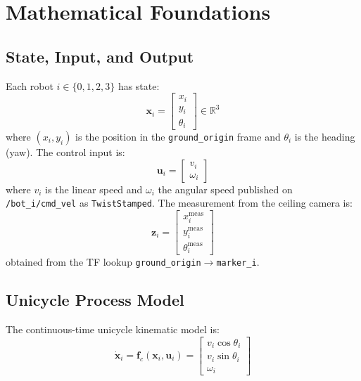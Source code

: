 \documentclass[12pt,a4paper]{article}
\begin{document}
\section{Mathematical Foundations}
\label{sec:math}

\subsection{State, Input, and Output}

Each robot $i \in \{0,1,2,3\}$ has state:
\begin{equation}
  \bm{x}_i = \begin{bmatrix} x_i \\ y_i \\ \theta_i \end{bmatrix} \in \mathbb{R}^3
\end{equation}
where $(x_i, y_i)$ is the position in the \texttt{ground\_origin} frame and
$\theta_i$ is the heading (yaw). The control input is:
\begin{equation}
  \bm{u}_i = \begin{bmatrix} v_i \\ \omega_i \end{bmatrix}
\end{equation}
where $v_i$ is the linear speed and $\omega_i$ the angular speed published on
\texttt{/bot\_i/cmd\_vel} as \texttt{TwistStamped}. The measurement from the
ceiling camera is:
\begin{equation}
  \bm{z}_i = \begin{bmatrix} x_i^{\text{meas}} \\ y_i^{\text{meas}} \\ \theta_i^{\text{meas}} \end{bmatrix}
\end{equation}
obtained from the TF lookup \texttt{ground\_origin}$\to$\texttt{marker\_i}.

\subsection{Unicycle Process Model}

The continuous-time unicycle kinematic model is:
\begin{equation}
  \dot{\bm{x}}_i = \bm{f}_c(\bm{x}_i, \bm{u}_i)
  = \begin{bmatrix} v_i \cos\theta_i \\ v_i \sin\theta_i \\ \omega_i \end{bmatrix}
  \label{eq:cont}
\end{equation}
\end{document}
